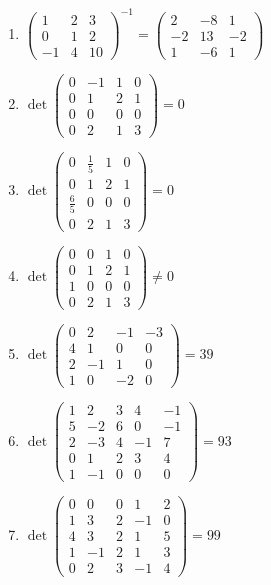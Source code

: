 \documentclass[11pt,a4paper]{article}
\begin{document}
\begin{enumerate}
\item $\displaystyle \begin{pmatrix} 1 & 2 & 3 \\ 0 & 1 & 2 \\ -1 & 4 & 10 \end{pmatrix}^{-1} = \begin{pmatrix} 2 & -8 & 1 \\ -2 & 13 & -2 \\ 1 & -6 & 1 \end{pmatrix}$
\item $\displaystyle \det \begin{pmatrix} 0 & -1 & 1 & 0 \\ 0 & 1 & 2 & 1 \\ 0 & 0 & 0 & 0 \\ 0 & 2 & 1 & 3 \end{pmatrix} = 0$
\item $\displaystyle \det \begin{pmatrix} 0 & \frac{1}{5} & 1 & 0 \\ 0 & 1 & 2 & 1 \\ \frac{6}{5} & 0 & 0 & 0 \\ 0 & 2 & 1 & 3 \end{pmatrix} = 0$
\item $\displaystyle \det \begin{pmatrix} 0 & 0 & 1 & 0 \\ 0 & 1 & 2 & 1 \\ 1 & 0 & 0 & 0 \\ 0 & 2 & 1 & 3 \end{pmatrix} \neq 0$
\item $\displaystyle \det \begin{pmatrix} 0 & 2 & -1 & -3 \\ 4 & 1 & 0 & 0 \\ 2 & -1 & 1 & 0 \\ 1 & 0 & -2 & 0 \end{pmatrix} = 39$
\item $\displaystyle \det \begin{pmatrix} 1 & 2 & 3 & 4 & -1 \\ 5 & -2 & 6 & 0 & -1 \\ 2 & -3 & 4 & -1 & 7 \\ 0 & 1 & 2 & 3 & 4 \\ 1 & -1 & 0 & 0 & 0 \end{pmatrix} = 93$
\item $\displaystyle \det \begin{pmatrix} 0 & 0 & 0 & 1 & 2 \\ 1 & 3 & 2 & -1 & 0 \\ 4 & 3 & 2 & 1 & 5 \\ 1 & -1 & 2 & 1 & 3 \\ 0 & 2 & 3 & -1 & 4 \end{pmatrix} = 99$

\end{enumerate}
\end{document}
